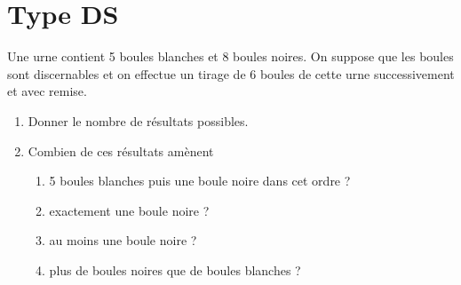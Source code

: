 \documentclass[a4paper, 11pt]{article}
\begin{document}



\section*{Type DS}
\begin{exercice}   \;
	Une urne contient 5 boules blanches et 8 boules noires. On suppose que les boules sont discernables et on effectue un tirage de 6 boules de cette urne successivement et avec remise.
	\begin{enumerate}
		\item Donner le nombre de r\'esultats possibles.
		\item Combien de ces r\'esultats am\`enent
		      \begin{enumerate}
			      \item 5 boules blanches puis une boule noire dans cet ordre ?
			      \item exactement une boule noire ?
			      \item au moins une boule noire ?
			      \item plus de boules noires que de boules blanches ?
		      \end{enumerate}
	\end{enumerate}
\end{exercice}
\end{document}
